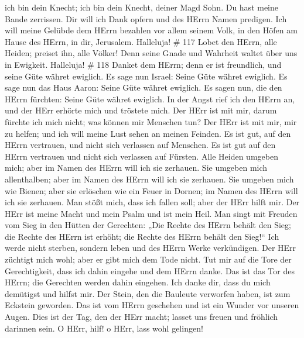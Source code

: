 ich bin dein Knecht; ich bin dein Knecht, deiner Magd Sohn. Du hast
meine Bande zerrissen.  Dir will ich Dank opfern und des
HErrn Namen predigen.  Ich will meine Gelübde dem HErrn
bezahlen vor allem seinem Volk,  in den Höfen am Hause des
HErrn, in dir, Jerusalem. Halleluja! \# 117  Lobet den
HErrn, alle Heiden; preiset ihn, alle Völker!  Denn seine
Gnade und Wahrheit waltet über uns in Ewigkeit. Halleluja! \# 118
 Danket dem HErrn; denn er ist freundlich, und seine Güte
währet ewiglich.  Es sage nun Israel: Seine Güte währet
ewiglich.  Es sage nun das Haus Aaron: Seine Güte währet
ewiglich.  Es sagen nun, die den HErrn fürchten: Seine Güte
währet ewiglich.  In der Angst rief ich den HErrn an, und
der HErr erhörte mich und tröstete mich.  Der HErr ist mit
mir, darum fürchte ich mich nicht; was können mir Menschen tun?
 Der HErr ist mit mir, mir zu helfen; und ich will meine
Lust sehen an meinen Feinden.  Es ist gut, auf den HErrn
vertrauen, und nicht sich verlassen auf Menschen.  Es ist
gut auf den HErrn vertrauen und nicht sich verlassen auf Fürsten.
 Alle Heiden umgeben mich; aber im Namen des HErrn will ich
sie zerhauen.  Sie umgeben mich allenthalben; aber im Namen
des HErrn will ich sie zerhauen.  Sie umgeben mich wie
Bienen; aber sie erlöschen wie ein Feuer in Dornen; im Namen des HErrn
will ich sie zerhauen.  Man stößt mich, dass ich fallen
soll; aber der HErr hilft mir.  Der HErr ist meine Macht
und mein Psalm und ist mein Heil.  Man singt mit Freuden
vom Sieg in den Hütten der Gerechten: „Die Rechte des HErrn behält den
Sieg;  die Rechte des HErrn ist erhöht; die Rechte des
HErrn behält den Sieg!{}``  Ich werde nicht sterben,
sondern leben und des HErrn Werke verkündigen.  Der HErr
züchtigt mich wohl; aber er gibt mich dem Tode nicht.  Tut
mir auf die Tore der Gerechtigkeit, dass ich dahin eingehe und dem HErrn
danke.  Das ist das Tor des HErrn; die Gerechten werden
dahin eingehen.  Ich danke dir, dass du mich demütigst und
hilfst mir.  Der Stein, den die Bauleute verworfen haben,
ist zum Eckstein geworden.  Das ist vom HErrn geschehen und
ist ein Wunder vor unseren Augen.  Dies ist der Tag, den
der HErr macht; lasset uns freuen und fröhlich darinnen sein.
 O HErr, hilf! o HErr, lass wohl gelingen! 
